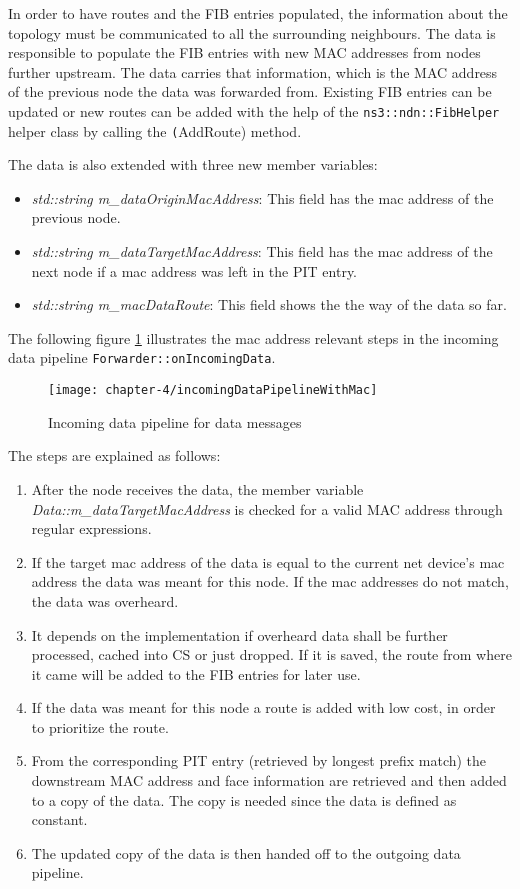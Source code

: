 In order to have routes and the FIB entries populated, the information about the topology must be communicated to all the surrounding neighbours. The data is responsible to populate the FIB entries with new MAC addresses from nodes further upstream. The data carries that information, which is the MAC address of the previous node the data was forwarded from. Existing FIB entries can be updated or new routes can be added with the help of the \texttt{ns3::ndn::FibHelper} helper class by calling the \texttt(AddRoute) method.

The data is also extended with three new member variables:

\begin{itemize}
\item \emph{std::string m\_dataOriginMacAddress}: This field has the mac address of the previous node.
\item \emph{std::string m\_dataTargetMacAddress}: This field has the mac address of the next node if a mac address was left in the PIT entry.
\item \emph{std::string m\_macDataRoute}: This field shows the the way of the data so far.
\end{itemize}

The following figure \ref{fig:incomingDataPipelineWithMac} illustrates the mac address relevant steps in the incoming data pipeline \texttt{Forwarder::onIncomingData}.

\begin{figure}[H]
  \centering
  \texttt{[image: chapter-4/incomingDataPipelineWithMac]}
  \caption{Incoming data pipeline for data messages}
  \label{fig:incomingDataPipelineWithMac}
\end{figure}

The steps are explained as follows:

\begin{enumerate}
\item After the node receives the data, the member variable  \emph{Data::m\_dataTargetMacAddress} is checked for a valid MAC address through regular expressions.
\item If the target mac address of the data is equal to the current net device's mac address the data was meant for this node. If the mac addresses do not match, the data was overheard.
\item It depends on the implementation if overheard data shall be further processed, cached into CS or just dropped. If it is saved, the route from where it came will be added to the FIB entries for later use.
\item If the data was meant for this node a route is added with low cost, in order to prioritize the route.
\item From the corresponding PIT entry (retrieved by longest prefix match) the downstream MAC address and face information are retrieved and then added to a copy of the data. The copy is needed since the data is defined as constant.
\item The updated copy of the data is then handed off to the outgoing data pipeline.
\end{enumerate}

